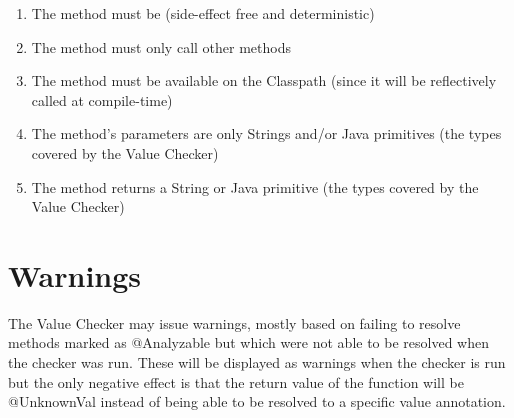 \begin{enumerate}

\item The method must be  (side-effect free and deterministic)

\item The method must only call other  methods

\item The method must be available on the Classpath (since it will be reflectively called at compile-time)

\item The method's parameters are only Strings and/or Java primitives
(the types covered by the Value Checker)

\item The method returns a String or Java primitive (the types covered
by the Value Checker)

\end{enumerate}

\section{Warnings}
The Value Checker may issue warnings, mostly based on failing to
resolve methods marked as @Analyzable but which were not able to be
resolved when the checker was run. These will be displayed as warnings when
the checker is run but the only negative effect is that the return
value of the function will be @UnknownVal instead of being able to be
resolved to a specific value annotation.

